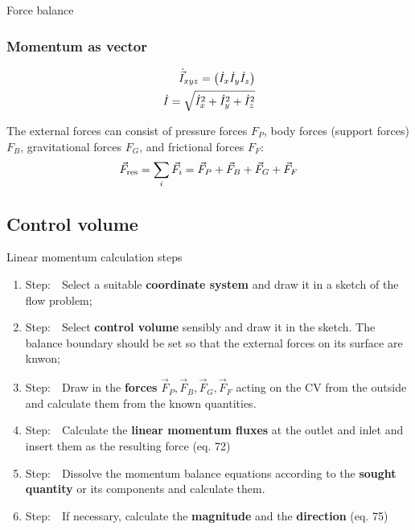 \documentclass{article}
\begin{document}
\begin{multicols}{2}
\begin{theorybox}{Force balance}
    \subsubsection{Momentum as vector}
    \vspace*{-0.3cm}
    \begin{align}
        \dot{\vec{I}}_{xyz} = \left(\dot{I}_x \dot{I}_y \dot{I}_z\right) \notag \\
        \dot{I} = \sqrt{\dot{I}_x^2 + \dot{I}_y^2 + \dot{I}_z^2}
    \end{align}

    The external forces can consist of pressure forces $F_P$, body forces (support forces) $F_B$, gravitational forces $F_G$, and frictional forces $F_F$:
    \begin{equation}
        \vec{F}_{\rm res} = \sum_{i} \vec{F}_i = \vec{F}_P + \vec{F}_B + \vec{F}_G + \vec{F}_F
    \end{equation}
\end{theorybox}

\subsection{Control volume}
\begin{examplebox}{Linear momentum calculation steps}
    \begin{enumerate}[label=\Roman*]
        \item Step:\ \ Select a suitable \textbf{coordinate system} and draw it
            in a sketch of the flow problem;
        \item Step:\ \ Select \textbf{control volume} sensibly and draw it in the sketch.
            The balance boundary should be set so that the external forces
            on its surface are knwon;
        \item Step:\ \ Draw in the \textbf{forces} $\vec{F}_P, \vec{F}_B, \vec{F}_G, \vec{F}_F$
            acting on the CV from the outside and calculate them from the known quantities.
        \item Step:\ \ Calculate the \textbf{linear momentum fluxes} at the
            outlet and inlet and insert them as the resulting force (eq. 72)
        \item Step:\ \ Dissolve the momentum balance equations according to the
            \textbf{sought quantity} or its components and calculate them.
        \item Step:\ \ If necessary, calculate the \textbf{magnitude} and the \textbf{direction} (eq. 75)
    \end{enumerate}


\end{examplebox}
\end{multicols}
\end{document}
